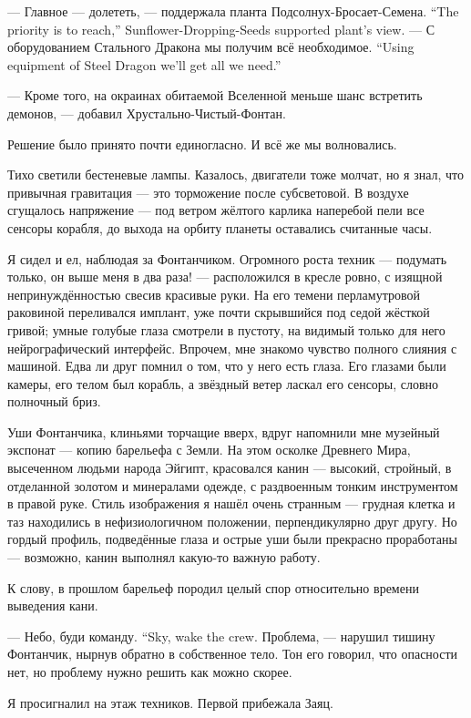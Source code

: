 {--- Главное --- долететь, --- поддержала планта Подсолнух-Бросает-Семена.}
{``The priority is to reach,'' Sunflower-Dropping-Seeds supported plant's view.}
{--- С оборудованием Стального Дракона мы получим всё необходимое.}
{``Using equipment of Steel Dragon we'll get all we need.''}

--- Кроме того, на окраинах обитаемой Вселенной меньше шанс встретить демонов, --- добавил Хрустально-Чистый-Фонтан.

Решение было принято почти единогласно.
И всё же мы волновались.

Тихо светили бестеневые лампы.
Казалось, двигатели тоже молчат, но я знал, что привычная гравитация --- это торможение после субсветовой.
В воздухе сгущалось напряжение --- под ветром жёлтого карлика наперебой пели все сенсоры корабля, до выхода на орбиту планеты оставались считанные часы.

Я сидел и ел, наблюдая за Фонтанчиком.
Огромного роста техник --- подумать только, он выше меня в два раза! --- расположился в кресле ровно, с изящной непринуждённостью свесив красивые руки.
На его темени перламутровой раковиной переливался имплант, уже почти скрывшийся под седой жёсткой гривой;
умные голубые глаза смотрели в пустоту, на видимый только для него нейрографический интерфейс.
Впрочем, мне знакомо чувство полного слияния с машиной.
Едва ли друг помнил о том, что у него есть глаза.
Его глазами были камеры, его телом был корабль, а звёздный ветер ласкал его сенсоры, словно полночный бриз.

Уши Фонтанчика, клиньями торчащие вверх, вдруг напомнили мне музейный экспонат --- копию барельефа с Земли.
На этом осколке Древнего Мира, высеченном людьми народа Эйгипт, красовался канин --- высокий, стройный, в отделанной золотом и минералами одежде, с раздвоенным тонким инструментом в правой руке.
Стиль изображения я нашёл очень странным --- грудная клетка и таз находились в нефизиологичном положении, перпендикулярно друг другу.
Но гордый профиль, подведённые глаза и острые уши были прекрасно проработаны --- возможно, канин выполнял какую-то важную работу.

К слову, в прошлом барельеф породил целый спор относительно времени выведения кани.

{--- Небо, буди команду.}
{``Sky, wake the crew.}
Проблема, --- нарушил тишину Фонтанчик, нырнув обратно в собственное тело.
Тон его говорил, что опасности нет, но проблему нужно решить как можно скорее.

Я просигналил на этаж техников.
Первой прибежала Заяц.

